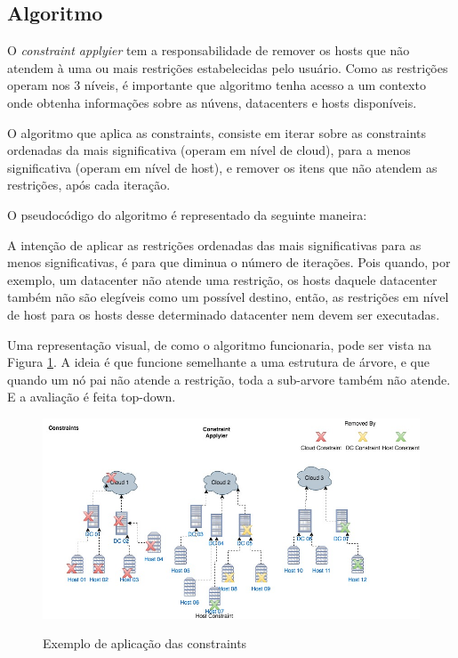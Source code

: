 \subsection{Algoritmo}
O \textit{constraint applyier} tem a responsabilidade de remover os hosts que não atendem à
uma ou mais restrições estabelecidas pelo usuário. Como as restrições operam nos 3 níveis,
é importante que algoritmo tenha acesso a um contexto onde obtenha informações sobre as núvens, 
datacenters e hosts disponíveis.

O algoritmo que aplica as constraints, consiste em iterar sobre as constraints ordenadas da mais significativa 
(operam em nível de cloud), para a menos significativa (operam em nível de host), e remover os itens que não atendem as
restrições, após cada iteração.

O pseudocódigo do algoritmo é representado da seguinte maneira:

\clearpage



A intenção de aplicar as restrições ordenadas das mais significativas
para as menos significativas, é para que diminua o número de iterações.
Pois quando, por exemplo, um datacenter não atende uma restrição, os hosts daquele datacenter 
também não são elegíveis como um possível destino, então, as restrições em nível de host para
os hosts desse determinado datacenter nem devem ser executadas. 

Uma representação visual, de como o algoritmo funcionaria, pode ser vista na Figura \ref{fig:constraintapplyier}. 
A ideia é que funcione semelhante a uma estrutura de árvore, e que quando um nó pai não atende a restrição, 
toda a sub-arvore também não atende. E a avaliação é feita top-down.

\begin{figure}[!htb]
  \centering
  \caption{Exemplo de aplicação das constraints}
  \includegraphics[width=1\textwidth]{./dados/figuras/constraintapplyier}
  \label{fig:constraintapplyier}
\end{figure}

